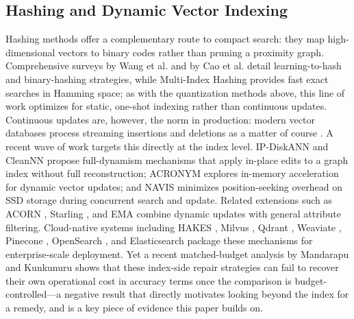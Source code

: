 \documentclass{ieeeaccess}
\begin{document}
\subsection{Hashing and Dynamic Vector Indexing}
Hashing methods offer a complementary route to compact search: they map high-dimensional vectors to binary codes rather than pruning a proximity graph. Comprehensive surveys by Wang et al. \cite{Wang2014, Wang2016} and by Cao et al. \cite{Cao2018Access} detail learning-to-hash and binary-hashing strategies, while Multi-Index Hashing \cite{Norouzi2012} provides fast exact searches in Hamming space; as with the quantization methods above, this line of work optimizes for static, one-shot indexing rather than continuous updates. Continuous updates are, however, the norm in production: modern vector databases process streaming insertions and deletions as a matter of course \cite{Xu2023, FreshDiskANN2022}. A recent wave of work targets this directly at the index level. IP-DiskANN \cite{Xu2025} and CleanNN \cite{CleanNN2025} propose full-dynamism mechanisms that apply in-place edits to a graph index without full reconstruction; ACRONYM \cite{Acronym2026} explores in-memory acceleration for dynamic vector updates; and NAVIS \cite{Navis2026} minimizes position-seeking overhead on SSD storage during concurrent search and update. Related extensions such as ACORN \cite{Patel2024}, Starling \cite{Wang2024}, and EMA \cite{EMA2026} combine dynamic updates with general attribute filtering. Cloud-native systems including HAKES \cite{HAKES2025}, Milvus \cite{Milvus}, Qdrant \cite{Qdrant}, Weaviate \cite{Weaviate}, Pinecone \cite{Pinecone}, OpenSearch \cite{OpenSearch}, and Elasticsearch \cite{Elastic} package these mechanisms for enterprise-scale deployment. Yet a recent matched-budget analysis by Mandarapu and Kunkunuru \cite{Mandarapu2026} shows that these index-side repair strategies can fail to recover their own operational cost in accuracy terms once the comparison is budget-controlled---a negative result that directly motivates looking beyond the index for a remedy, and is a key piece of evidence this paper builds on.
\end{document}
